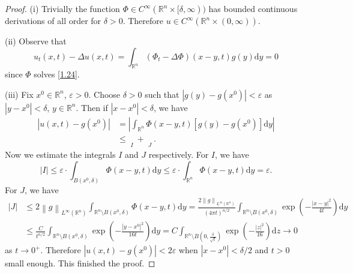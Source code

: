 \begin{proof}
(i) Trivially the function $\Phi\in C^\infty(\mathbb{R}^n\times[\delta,\infty))$ has bounded continuous derivations of all order for $\delta>0$. Therefore $u\in C^\infty(\mathbb{R}^n\times(0,\infty))$.\par
(ii) Observe that 
$$
u_t\left( x,t \right) -\Delta u\left( x,t \right) =\int_{\mathbb{R} ^n}{\left( \Phi _t-\Delta \Phi \right) \left( x-y,t \right) g\left( y \right) \mathrm{d}y}=0
$$
since $\Phi$ solves \eqref{1.24}.\par
(iii) Fix $x^0\in\mathbb{R}^n$, $\varepsilon>0$. Choose $\delta>0$ such that $|g(y)-g(x^0)|<\varepsilon$ as $|y-x^0|<\delta$, $y\in\mathbb{R}^n$. Then if $|x-x^0|<\delta$, we have 
$$
\begin{aligned}
\left| u\left( x,t \right) -g\left( x^0 \right) \right|&=\left| \int_{\mathbb{R} ^n}{\Phi \left( x-y,t \right) \left[ g\left( y \right) -g\left( x^0 \right) \right] \mathrm{d}y} \right|
\\
&\le \mathop {\underbrace{\int_{B\left( x^0,\delta \right)}{\Phi \left( x-y,t \right) \cdot \left| g\left( y \right) -g\left( x^0 \right) \right|\mathrm{d}y}}} \limits_{I}+\mathop {\underbrace{\int_{\mathbb{R} ^n\setminus B\left( x^0,\delta \right)}{\Phi \left( x-y,t \right) \cdot \left| g\left( y \right) -g\left( x^0 \right) \right|\mathrm{d}y}}} \limits_{J}.
\end{aligned}
$$
Now we estimate the integrals $I$ and $J$ respectively. For $I$, we have 
$$
\left| I \right|\le \varepsilon \cdot \int_{B\left( x^0,\delta \right)}{\Phi \left( x-y,t \right) \mathrm{d}y}\le \varepsilon \cdot \int_{\mathbb{R} ^n}{\Phi \left( x-y,t \right) \mathrm{d}y}=\varepsilon .
$$
For $J$, we have 
$$
\begin{aligned}
\left| J \right|&\le 2\left\| g \right\| _{L^{\infty}\left( \mathbb{R} ^n \right)}\int_{\mathbb{R} ^n\setminus B\left( x^0,\delta \right)}{\Phi \left( x-y,t \right) \mathrm{d}y}=\frac{2\left\| g \right\| _{L^{\infty}\left( \mathbb{R} ^n \right)}}{\left( 4\pi t \right) ^{n/2}}\int_{\mathbb{R} ^n\setminus B\left( x^0,\delta \right)}{\exp \left( -\frac{\left| x-y \right|^2}{4t} \right) \mathrm{d}y}
\\
&\le \frac{C}{t^{n/2}}\int_{\mathbb{R} ^n\setminus B\left( x^0,\delta \right)}{\exp \left( -\frac{\left| y-x^0 \right|^2}{16t} \right) \mathrm{d}y}=C\int_{\mathbb{R} ^n\setminus B\left( 0,\frac{\delta}{\sqrt{t}} \right)}{\exp \left( -\frac{\left| z \right|^2}{16} \right) \mathrm{d}z}\rightarrow 0
\end{aligned}
$$
as $t\to 0^+$. Therefore $|u(x,t)-g(x^0)|<2\varepsilon$ when $|x-x^0|<\delta/2$ and $t>0$ small enough. This finished the proof.
\end{proof}
